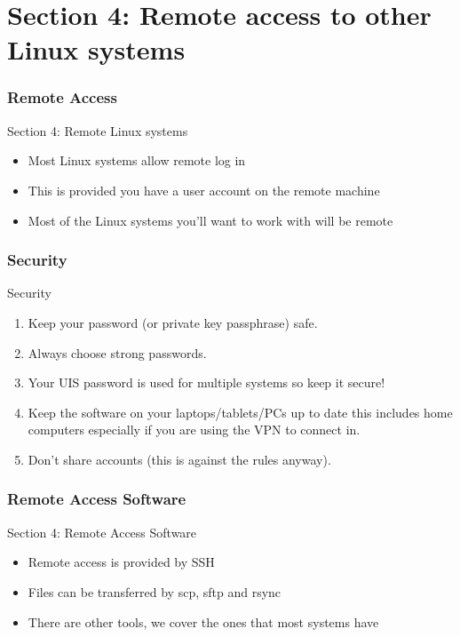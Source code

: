 \part{Section 4: Remote access to other Linux systems}
\begin{frame}
\partpage
\end{frame}

\section{Remote Access}
\begin{frame}{Section 4: Remote Linux systems}
\begin{itemize}
\item Most Linux systems allow remote log in
\item This is provided you have a user account on the remote machine
\item Most of the Linux systems you'll want to work with will be remote
\end{itemize}
\end{frame}

\section{Security}
\begin{frame}{Security}
\begin{enumerate}
\item{\alert{Keep your password (or private key passphrase) safe.}}
\pause
\item{\alert{Always choose strong passwords.}}
\pause
\item{\alert{Your UIS password is used for multiple systems so keep it secure!}}
\pause
\item{Keep the software on your laptops/tablets/PCs up to date this includes home computers especially if you are using the VPN to connect in.}
\pause
\item{Don't share accounts (this is against the rules anyway).}
\end{enumerate}
\end{frame}

\section{Remote Access Software}
\begin{frame}{Section 4: Remote Access Software}
\begin{itemize}
\item Remote access is provided by SSH
\item Files can be transferred by scp, sftp and rsync
\item There are other tools, we cover the ones that most systems have
\end{itemize}
\end{frame}

